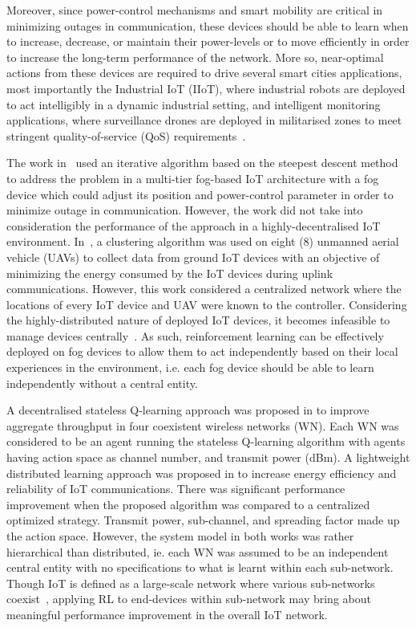 \documentclass[journal]{IEEEtran}
\begin{document}
Moreover, since power-control mechanisms and smart mobility are critical in minimizing outages in communication, these devices should be able to learn when to increase, decrease, or maintain their power-levels or to move efficiently in order to increase the long-term performance of the network. More so, near-optimal actions from these devices are required to drive several smart cities applications, most importantly the Industrial IoT (IIoT), where industrial robots are deployed to act intelligibly in a dynamic industrial setting, and intelligent monitoring applications, where surveillance drones are deployed in militarised zones to meet stringent quality-of-service (QoS) requirements~\cite{OmoniwaRelay2018}.

The work in~\cite{OmoniwaRelay2018} used an iterative algorithm based on the steepest descent method to address the problem in a multi-tier fog-based IoT architecture with a fog device which could adjust its position and power-control parameter in order to minimize outage in communication. However, the work did not take into consideration the performance of the approach in a highly-decentralised IoT environment. In~\cite{Mozaffari2016}, a clustering algorithm was used on eight (8) unmanned aerial vehicle (UAVs) to collect data from ground IoT devices with an objective of minimizing the energy consumed by the IoT devices during uplink communications. However, this work considered a centralized network where the locations of every IoT device and UAV were known to the controller. Considering the highly-distributed nature of deployed IoT devices, it becomes infeasible to manage devices centrally~\cite{Wilhelmi2017}. As such, reinforcement learning can be effectively deployed on fog devices to allow them to act independently based on their local experiences in the environment, i.e. each fog device should be able to learn independently without a central entity.

A decentralised stateless Q-learning approach was proposed in \cite{Wilhelmi2017} to improve aggregate throughput in four coexistent wireless networks (WN). Each WN was considered to be an agent running the stateless Q-learning algorithm with agents having action space as channel number, and transmit power
(dBm). A lightweight distributed learning approach was proposed in \cite{Azari2018} to increase energy efficiency and reliability of IoT communications. There was significant performance improvement when the proposed algorithm was compared to a centralized optimized strategy. Transmit power, sub-channel, and spreading factor made up the action space. However, the system model in both works was rather hierarchical than distributed, ie. each WN was assumed to be an independent central entity with no specifications to what is learnt within each sub-network. Though IoT is defined as a large-scale network where various sub-networks coexist~\cite{Omoniwa2018}, applying RL to end-devices within sub-network may bring about meaningful performance improvement in the overall IoT network.
\end{document}
